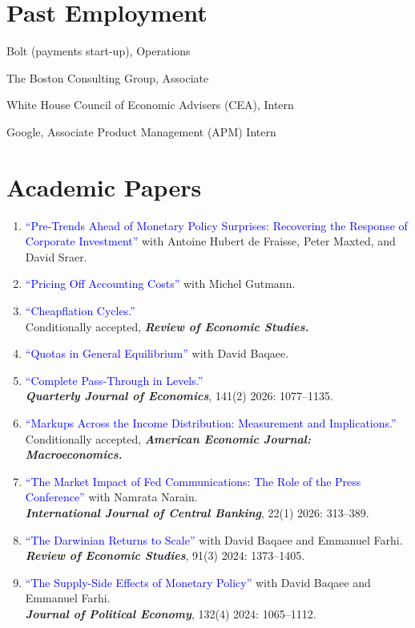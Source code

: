 \documentclass[letterpaper]{article}
\newcommand{\academicpaper}[1]{\textcolor{Blue}{{``#1''}}}
\newcommand{\journal}[1]{\textbf{\textit{#1}}}
\begin{document}
\section*{Past Employment}
\begin{description}[labelindent=0pt, labelwidth=0.7in, labelsep*=1em, leftmargin =!, font=\normalfont]
\item[2018--19] Bolt (payments start-up), Operations
\item[2017--18] The Boston Consulting Group, Associate
\item[2016] White House Council of Economic Advisers (CEA), Intern
\item[2016] Google, Associate Product Management (APM) Intern
\end{description}

\section*{Academic Papers}
\begin{enumerate}
\item \academicpaper{Pre-Trends Ahead of Monetary Policy Surprises: Recovering the Response of Corporate Investment} {with Antoine Hubert de Fraisse, Peter Maxted, and David Sraer.} 
\item \academicpaper{Pricing Off Accounting Costs} {with Michel Gutmann.} 
\item \academicpaper{Cheapflation Cycles.} \\
Conditionally accepted, \journal{Review of Economic Studies.}
\item \academicpaper{Quotas in General Equilibrium} {with David Baqaee.} 
\item \academicpaper{Complete Pass-Through in Levels.}\\
\journal{Quarterly Journal of Economics}, 141(2) 2026: 1077--1135.
\item \academicpaper{Markups Across the Income Distribution: Measurement and Implications.}\\
Conditionally accepted, \journal{American Economic Journal: Macroeconomics.}
\item \academicpaper{The Market Impact of Fed Communications: The Role of the Press Conference} 
{with Namrata Narain.}\\
\journal{International Journal of Central Banking}, 22(1) 2026: 313--389.
\item \academicpaper{The Darwinian Returns to Scale} 
{with David Baqaee and Emmanuel Farhi.}\\ 
\journal{Review of Economic Studies}, 91(3) 2024: 1373--1405.
\item \academicpaper{The Supply-Side Effects of Monetary Policy} 
{with David Baqaee and Emmanuel Farhi.}\\ 
\journal{Journal of Political Economy}, 132(4) 2024: 1065--1112.
\end{enumerate}
\end{document}

